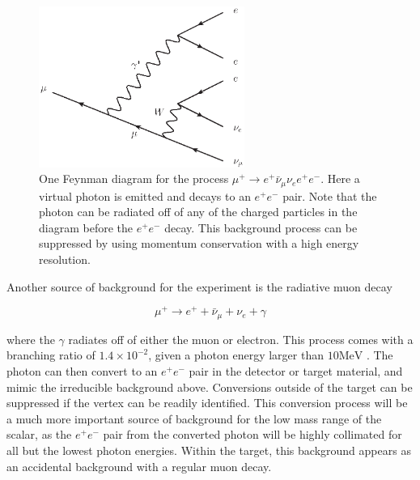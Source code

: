 \begin{figure}[h]
    \centering
    \includegraphics[width = 0.6\textwidth]{Figures/feynman_diagrams/mu_eeenunu_SM.eps}
    \caption{One Feynman diagram for the process $\mu^+ \rightarrow e^+ \bar{\nu}_\mu \nu_e e^+ e^-$. Here a virtual photon is emitted and decays to an $e^+ e^-$ pair. Note that the photon can be radiated off of any of the charged particles in the diagram before the $e^+ e^-$ decay. This background process can be suppressed by using momentum conservation with a high energy resolution.}
    \label{fig:mu_eeenunu_SM}
\end{figure}


Another source of background for the experiment is the radiative muon decay

\begin{equation}
    \mu^+ \rightarrow e^+ + \bar{\nu}_\mu + \nu_e + \gamma
\end{equation}

\noindent where the $\gamma$ radiates off of either the muon or electron.
This process comes with a branching ratio of $1.4 \times 10^{-2}$, given a photon energy larger than $10\textrm{MeV}$ \cite{Agashe:2014kda}.
The photon can then convert to an $e^+ e^-$ pair in the detector or target material, and mimic the irreducible background above.
Conversions outside of the target can be suppressed if the vertex can be readily identified.
This conversion process will be a much more important source of background for the low mass range of the scalar, as the $e^+ e^-$ pair from the converted photon will be highly collimated for all but the lowest photon energies.
Within the target, this background appears as an accidental background with a regular muon decay.

